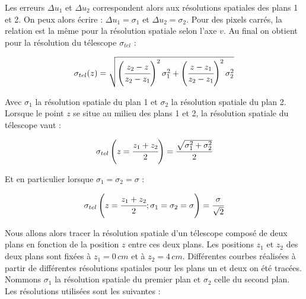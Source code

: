   Les erreurs $\Delta u_1$ et $\Delta u_2$ correspondent alors aux r\'esolutions spatiales des plans 1 et 2. On peux alors \'ecrire : $\Delta u_1 = \sigma_1$ et $\Delta u_2 = \sigma_2$. Pour des pixels carr\'es, la relation est la m\^eme pour la r\'esolution spatiale selon l'axe $v$. Au final on obtient pour la r\'esolution du t\'elescope $\sigma_{tel}$ : 
  
  \begin{equation}
   \sigma_{tel}(z) = \sqrt{ \left( \cfrac{z_2 - z}{z_2 - z_1} \right)^2 \sigma_{1}^2 + \left( \cfrac{z - z_1}{z_2 - z_1} \right)^2  \sigma_{2}^2 }
  \label{eq:propag_erreurs}
  \end{equation}  
  
  Avec $\sigma_{1}$ la r\'esolution spatiale du plan 1 et $\sigma_{2}$ la r\'esolution spatiale du plan 2. Lorsque le point $z$ se situe au milieu des plans 1 et 2, la r\'esolution spatiale du t\'elescope vaut :
  
  \begin{equation}
   \sigma_{tel}\left(z=\cfrac{z_1+z_2}{2} \right) = \cfrac{\sqrt{\sigma_1^2 + \sigma_2^2}}{2} 
   \label{eq:milieuTel}
  \end{equation}
  
  Et en particulier lorsque $\sigma_1 = \sigma_2 = \sigma$ :
  
  \begin{equation}
    \sigma_{tel}\left(z=\cfrac{z_1+z_2}{2} ; \sigma_1 = \sigma_2 = \sigma \right) = \cfrac{\sigma}{\sqrt{2}}
    \label{eq:reso_milieu}
  \end{equation}

  Nous allons alors tracer la r\'esolution spatiale d'un t\'elescope compos\'e de deux plans en fonction de la position $z$ entre ces deux plans. Les positions $z_1$ et $z_2$ des deux plans sont fix\'ees \`a $z_1 = 0 \, cm$ et \`a $z_2 = 4 \, cm$. Diff\'erentes courbes r\'ealis\'ees \`a partir de diff\'erentes r\'esolutions spatiales pour les plans un et deux on \'et\'e trac\'ees. Nommons $\sigma_1$ la r\'esolution spatiale du premier plan et $\sigma_2$ celle du second plan. Les r\'esolutions utilis\'ees sont les suivantes : 

